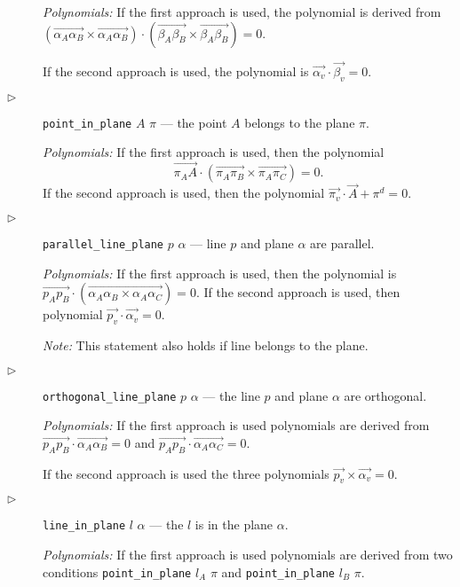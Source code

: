 \documentclass[final,1p,times,authoryear]{elsarticle}
\begin{document}
\begin{description}
{\em Polynomials:} If the first approach is used, the polynomial is
derived from $(\overrightarrow{\alpha_A\alpha_B} \times
\overrightarrow{\alpha_A\alpha_B}) \cdot
(\overrightarrow{\beta_A\beta_B} \times
\overrightarrow{\beta_A\beta_B}) = 0$.

If the second approach is used, the polynomial is
$\overrightarrow{\alpha_v} \cdot \overrightarrow{\beta_v} = 0$.

\item[$\triangleright$] {\tt point\_in\_plane} $A$ $\pi$ --- the point
  $A$ belongs to the plane $\pi$.

{\em Polynomials:} If the first approach is used, then the polynomial
$$\overrightarrow{\pi_AA}\cdot (\overrightarrow{\pi_A\pi_B} \times \overrightarrow{\pi_A\pi_C}) = 0.$$
If the second approach is used, then the polynomial
$\overrightarrow{\pi_v} \cdot \overrightarrow{A} + \pi^{d} = 0$.

\item[$\triangleright$] {\tt parallel\_line\_plane} $p$ $\alpha$ ---
  line $p$ and plane $\alpha$ are parallel.

{\em Polynomials:} 
If the first approach is used, then the polynomial is
$\overrightarrow{p_Ap_B} \cdot (\overrightarrow{\alpha_A\alpha_B \times \alpha_A\alpha_C}) = 0$.
If the second approach is used, then polynomial
$\overrightarrow{p_v} \cdot \overrightarrow{\alpha_v} = 0$.

{\em Note:} This statement also holds if line belongs to the plane.

\item[$\triangleright$] {\tt orthogonal\_line\_plane} $p$ $\alpha$ ---
  the line $p$ and plane $\alpha$ are orthogonal.

{\em Polynomials:} If the first approach is used polynomials are
derived from $\overrightarrow{p_Ap_B} \cdot
\overrightarrow{\alpha_A\alpha_B} = 0$ and $\overrightarrow{p_Ap_B}
\cdot \overrightarrow{\alpha_A\alpha_C} = 0$.

If the second approach is used the three polynomials
$\overrightarrow{p_v} \times \overrightarrow{\alpha_v} = 0$.

\item[$\triangleright$] {\tt line\_in\_plane} $l$ $\alpha$ --- the $l$
  is in the plane $\alpha$.


{\em Polynomials:} If the first approach is used polynomials are
derived from two conditions {\tt point\_in\_plane} $l_A$ $\pi$ and
{\tt point\_in\_plane} $l_B$ $\pi$.


\end{description}
\end{document}

